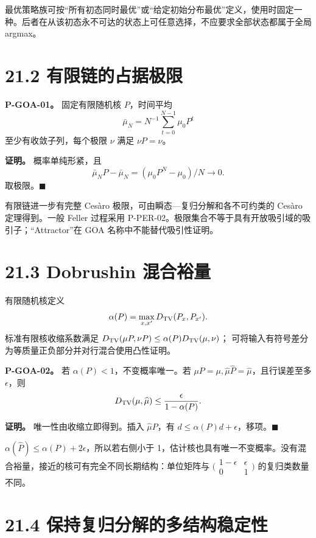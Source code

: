 \documentclass[
  11pt,
  oneside]{book}
\begin{document}
最优策略族可按``所有初态同时最优''或``给定初始分布最优''定义，使用时固定一种。后者在从该初态永不可达的状态上可任意选择，不应要求全部状态都属于全局 argmax。

\section{21.2 有限链的占据极限}\label{ux6709ux9650ux94feux7684ux5360ux636eux6781ux9650}

\hypertarget{p-goa-01}{}\label{p-goa-01}

\textbf{P-GOA-01。} 固定有限随机核 \(P\)，时间平均 \[\bar\mu_N=N^{-1}\sum_{t=0}^{N-1}\mu_0P^t\] 至少有收敛子列，每个极限 \(\nu\) 满足 \(\nu P=\nu\)。

\textbf{证明。} 概率单纯形紧，且 \[\bar\mu_NP-\bar\mu_N=(\mu_0P^N-\mu_0)/N\to0.\] 取极限。\(\blacksquare\)

有限链进一步有完整 Cesàro 极限，可由瞬态---复归分解和各不可约类的 Cesàro 定理得到。一般 Feller 过程采用 P-PER-02。极限集合不等于具有开放吸引域的吸引子；``Attractor''在 GOA 名称中不能替代吸引性证明。

\section{21.3 Dobrushin 混合裕量}\label{dobrushin-ux6df7ux5408ux88d5ux91cf}

有限随机核定义 \[\alpha(P)=\max_{x,x'}D_{\rm TV}(P_x,P_{x'}).\] 标准有限核收缩系数满足 \(D_{\rm TV}(\mu P,\nu P)\le\alpha(P)D_{\rm TV}(\mu,\nu)\)； 可将输入有符号差分为等质量正负部分并对行混合使用凸性证明。

\hypertarget{p-goa-02}{}\label{p-goa-02}

\textbf{P-GOA-02。} 若 \(\alpha(P)<1\)，不变概率唯一。若 \(\mu P=\mu,\widehat\mu\widehat P=\widehat\mu\)，且行误差至多 \(\epsilon\)，则 \[D_{\rm TV}(\mu,\widehat\mu)\le\frac{\epsilon}{1-\alpha(P)}.\]

\textbf{证明。} 唯一性由收缩立即得到。插入 \(\widehat\mu P\)，有 \(d\le\alpha(P)d+\epsilon\)，移项。\(\blacksquare\)

\(\alpha(\widehat P)\le\alpha(P)+2\epsilon\)，所以若右侧小于 1，估计核也具有唯一不变概率。没有混合裕量，接近的核可有完全不同长期结构：单位矩阵与 \(\bigl(\begin{smallmatrix}1-\epsilon&\epsilon\\0&1\end{smallmatrix}\bigr)\) 的复归类数量不同。

\section{21.4 保持复归分解的多结构稳定性}\label{ux4fddux6301ux590dux5f52ux5206ux89e3ux7684ux591aux7ed3ux6784ux7a33ux5b9aux6027}
\end{document}
